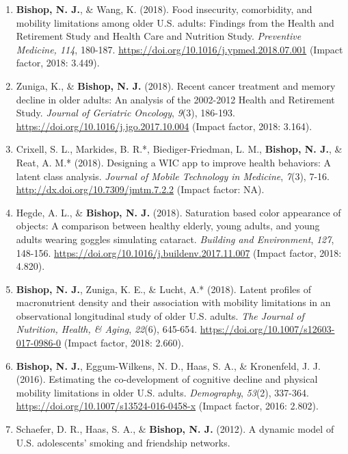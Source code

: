 \documentclass[
]{article}
\begin{document}
\begin{enumerate}
{  American College of Nutrition}, \emph{38}(6)\emph{,} 537-546.
  \url{https://doi.org/10.1080/07315724.2019.1566035} (Impact factor,
  2019: 2.297).
\item
  \textbf{Bishop, N. J.}, \& Wang, K. (2018). Food insecurity,
  comorbidity, and mobility limitations among older U.S. adults:
  Findings from the Health and Retirement Study and Health Care and
  Nutrition Study. \emph{Preventive Medicine, 114}, 180-187.
  \url{https://doi.org/10.1016/j.ypmed.2018.07.001} (Impact factor,
  2018: 3.449).
\item
  Zuniga, K., \& \textbf{Bishop, N. J.} (2018). Recent cancer treatment
  and memory decline in older adults: An analysis of the 2002-2012
  Health and Retirement Study. \emph{Journal of Geriatric Oncology},
  \emph{9}(3), 186-193. \url{https://doi.org/10.1016/j.jgo.2017.10.004}
  (Impact factor, 2018: 3.164).
\item
  Crixell, S. L., Markides, B. R.*, Biediger-Friedman, L. M.,
  \textbf{Bishop, N. J.}, \& Reat, A. M.* (2018). Designing a WIC app to
  improve health behaviors: A latent class analysis. \emph{Journal of
  Mobile Technology in Medicine}, \emph{7}(3), 7-16.
  \url{http://dx.doi.org/10.7309/jmtm.7.2.2} (Impact factor: NA).
\item
  Hegde, A. L., \& \textbf{Bishop, N. J.} (2018). Saturation based color
  appearance of objects: A comparison between healthy elderly, young
  adults, and young adults wearing goggles simulating cataract.
  \emph{Building and Environment}, \emph{127}, 148-156.
  \url{https://doi.org/10.1016/j.buildenv.2017.11.007} (Impact factor,
  2018: 4.820).
\item
  \textbf{Bishop, N. J.}, Zuniga, K. E., \& Lucht, A.* (2018). Latent
  profiles of macronutrient density and their association with mobility
  limitations in an observational longitudinal study of older U.S.
  adults. \emph{The Journal of Nutrition, Health, \& Aging},
  \emph{22}(6), 645-654. \url{https://doi.org/10.1007/s12603-017-0986-0}
  (Impact factor, 2018: 2.660).
\item
  \textbf{Bishop, N. J.}, Eggum-Wilkens, N. D., Haas, S. A., \&
  Kronenfeld, J. J. (2016). Estimating the co-development of cognitive
  decline and physical mobility limitations in older U.S. adults.
  \emph{Demography}, \emph{53}(2), 337-364.
  \url{https://doi.org/10.1007/s13524-016-0458-x} (Impact factor, 2016:
  2.802).
\item
  Schaefer, D. R., Haas, S. A., \& \textbf{Bishop, N. J.} (2012). A
  dynamic model of U.S. adolescents' smoking and friendship networks.

\end{enumerate}
\end{document}
